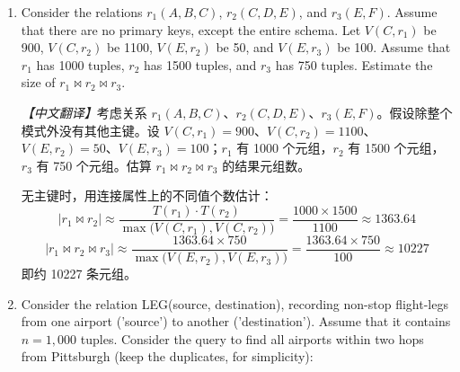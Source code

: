 \documentclass[UTF8,a4paper,11pt]{ctexart}
\newenvironment{answer}%
  {\begin{ans}\noindent{\bfseries\color{ansframe}【答案】}\hspace{0.4em}}%
  {\end{ans}}
\begin{document}
\begin{enumerate}
\noindent\textit{【中文翻译】}考虑关系 $r_1(A,B,C)$、$r_2(C,D,E)$、$r_3(E,F)$，其主键分别为 $A$、$C$、$E$。假设 $r_1$ 有 1000 个元组，$r_2$ 有 1500 个元组，$r_3$ 有 750 个元组。估算 $r_1\bowtie r_2\bowtie r_3$ 的结果元组数。

\begin{answer}
$r_2$ 的主键为 $C$，因此 $r_1$ 的每个元组在 $r_2$ 中至多匹配一个元组：$|r_1\bowtie r_2| \leq 1000$。\par
$r_3$ 的主键为 $E$，继续连接同样至多匹配一个 $r_3$ 元组，元组数不会增加：$|r_1\bowtie r_2\bowtie r_3| \leq 1000$。\par
若进一步假设 $r_1.C$ 引用 $r_2.C$、$r_2.E$ 引用 $r_3.E$（外键引用完整，且连接不丢失元组），则每个元组都能匹配到一条记录，估计值为：
\[
|r_1\bowtie r_2\bowtie r_3| = 1000
\]
\textbf{卷面建议表述：}结果最多 1000 条；若假设外键引用完整，则估计为 1000 条。仅凭主键信息不能保证精确等于 1000，因此不宜直接写“等于 1000”而不交代前提。
\end{answer}

\item Consider the relations $r_1(A,B,C)$, $r_2(C,D,E)$, and $r_3(E,F)$. Assume that there are no primary keys, except the entire schema. Let $V(C,r_1)$ be 900, $V(C,r_2)$ be 1100, $V(E,r_2)$ be 50, and $V(E,r_3)$ be 100. Assume that $r_1$ has 1000 tuples, $r_2$ has 1500 tuples, and $r_3$ has 750 tuples. Estimate the size of $r_1\bowtie r_2\bowtie r_3$.

\noindent\textit{【中文翻译】}考虑关系 $r_1(A,B,C)$、$r_2(C,D,E)$、$r_3(E,F)$。假设除整个模式外没有其他主键。设 $V(C,r_1)=900$、$V(C,r_2)=1100$、$V(E,r_2)=50$、$V(E,r_3)=100$；$r_1$ 有 1000 个元组，$r_2$ 有 1500 个元组，$r_3$ 有 750 个元组。估算 $r_1\bowtie r_2\bowtie r_3$ 的结果元组数。

\begin{answer}
无主键时，用连接属性上的不同值个数估计：
\[
|r_1\bowtie r_2| \approx \frac{T(r_1)\cdot T(r_2)}{\max\bigl(V(C,r_1),V(C,r_2)\bigr)}
= \frac{1000\times 1500}{1100} \approx 1363.64
\]
\[
|r_1\bowtie r_2\bowtie r_3| \approx \frac{1363.64\times 750}{\max\bigl(V(E,r_2),V(E,r_3)\bigr)}
= \frac{1363.64\times 750}{100} \approx 10227
\]
即约 10227 条元组。
\end{answer}

\item Consider the relation LEG(source, destination), recording non-stop flight-legs from one airport ('source') to another ('destination'). Assume that it contains $n=1{,}000$ tuples. Consider the query to find all airports within two hops from Pittsburgh (keep the duplicates, for simplicity):


\end{enumerate}
\end{document}
